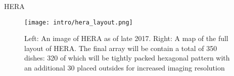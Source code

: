 HERA \cite{2017PASP..129d5001D}

\begin{figure}[ht]
	\centering
	\texttt{[image: intro/hera\_layout.png]}
	\caption[HERA Image and Layout]{Left: An image of HERA as of late 2017. Right: A map of
					 the full layout of HERA. The final array will be contain a total of 350 dishes: 320 of which
					 will be tightly packed hexagonal pattern with an additional 30 placed outsides for increased
					 imaging resolution}
	\label{fig:hera_layout}
\end{figure}
